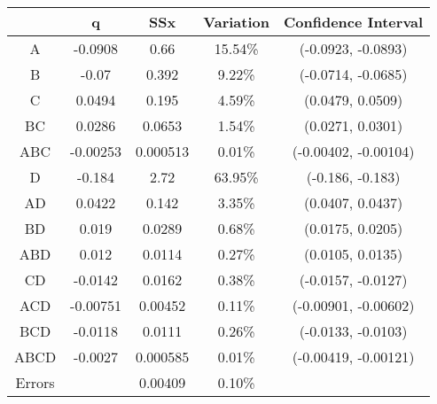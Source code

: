 \begin{center}
\begin{tabular}{|c|c|c|c|c|}
\cline{2-5}
\multicolumn{1}{c|}{} & q & SSx & Variation & Confidence Interval \\
\hline
A&-0.0908&0.66&15.54\% &(-0.0923, -0.0893) \\
\hline
B&-0.07&0.392&9.22\% &(-0.0714, -0.0685) \\
\hline
C&0.0494&0.195&4.59\% &(0.0479, 0.0509) \\
\hline
BC&0.0286&0.0653&1.54\% &(0.0271, 0.0301) \\
\hline
ABC&-0.00253&0.000513&0.01\% &(-0.00402, -0.00104) \\
\hline
D&-0.184&2.72&63.95\% &(-0.186, -0.183) \\
\hline
AD&0.0422&0.142&3.35\% &(0.0407, 0.0437) \\
\hline
BD&0.019&0.0289&0.68\% &(0.0175, 0.0205) \\
\hline
ABD&0.012&0.0114&0.27\% &(0.0105, 0.0135) \\
\hline
CD&-0.0142&0.0162&0.38\% &(-0.0157, -0.0127) \\
\hline
ACD&-0.00751&0.00452&0.11\% &(-0.00901, -0.00602) \\
\hline
BCD&-0.0118&0.0111&0.26\% &(-0.0133, -0.0103) \\
\hline
ABCD&-0.0027&0.000585&0.01\% &(-0.00419, -0.00121) \\
\hline
Errors& &0.00409&0.10\% & \\
\hline
\end{tabular}
\end{center}
